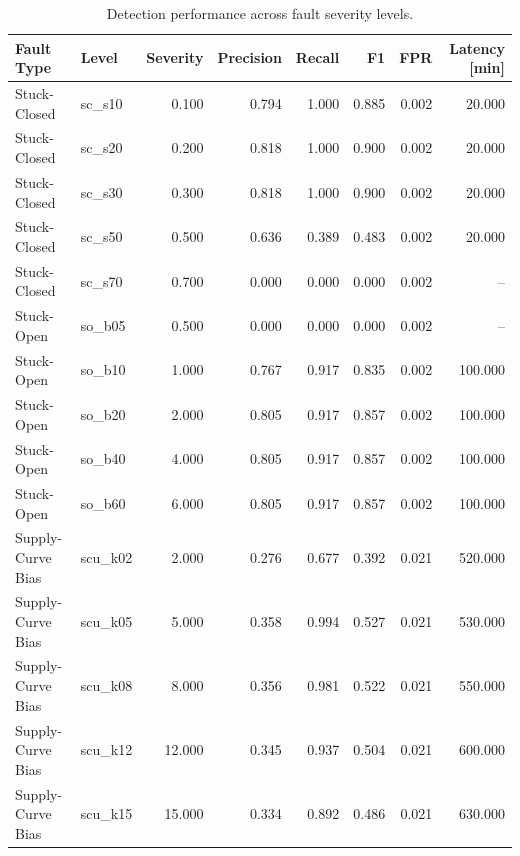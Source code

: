 \begin{table}[ht]
  \centering
  \caption{Detection performance across fault severity levels.}
  \label{tab:severity_detection}
  \small
  \begin{tabular}{llrrrrrr}
    \toprule
    Fault Type & Level & Severity & Precision & Recall & F1 & FPR & Latency [min] \\
    \midrule
    Stuck-Closed & sc_s10 & 0.100 & 0.794 & 1.000 & 0.885 & 0.002 & 20.000 \\
    Stuck-Closed & sc_s20 & 0.200 & 0.818 & 1.000 & 0.900 & 0.002 & 20.000 \\
    Stuck-Closed & sc_s30 & 0.300 & 0.818 & 1.000 & 0.900 & 0.002 & 20.000 \\
    Stuck-Closed & sc_s50 & 0.500 & 0.636 & 0.389 & 0.483 & 0.002 & 20.000 \\
    Stuck-Closed & sc_s70 & 0.700 & 0.000 & 0.000 & 0.000 & 0.002 & -- \\
    Stuck-Open & so_b05 & 0.500 & 0.000 & 0.000 & 0.000 & 0.002 & -- \\
    Stuck-Open & so_b10 & 1.000 & 0.767 & 0.917 & 0.835 & 0.002 & 100.000 \\
    Stuck-Open & so_b20 & 2.000 & 0.805 & 0.917 & 0.857 & 0.002 & 100.000 \\
    Stuck-Open & so_b40 & 4.000 & 0.805 & 0.917 & 0.857 & 0.002 & 100.000 \\
    Stuck-Open & so_b60 & 6.000 & 0.805 & 0.917 & 0.857 & 0.002 & 100.000 \\
    Supply-Curve Bias & scu_k02 & 2.000 & 0.276 & 0.677 & 0.392 & 0.021 & 520.000 \\
    Supply-Curve Bias & scu_k05 & 5.000 & 0.358 & 0.994 & 0.527 & 0.021 & 530.000 \\
    Supply-Curve Bias & scu_k08 & 8.000 & 0.356 & 0.981 & 0.522 & 0.021 & 550.000 \\
    Supply-Curve Bias & scu_k12 & 12.000 & 0.345 & 0.937 & 0.504 & 0.021 & 600.000 \\
    Supply-Curve Bias & scu_k15 & 15.000 & 0.334 & 0.892 & 0.486 & 0.021 & 630.000 \\
    \bottomrule
  \end{tabular}
\end{table}
